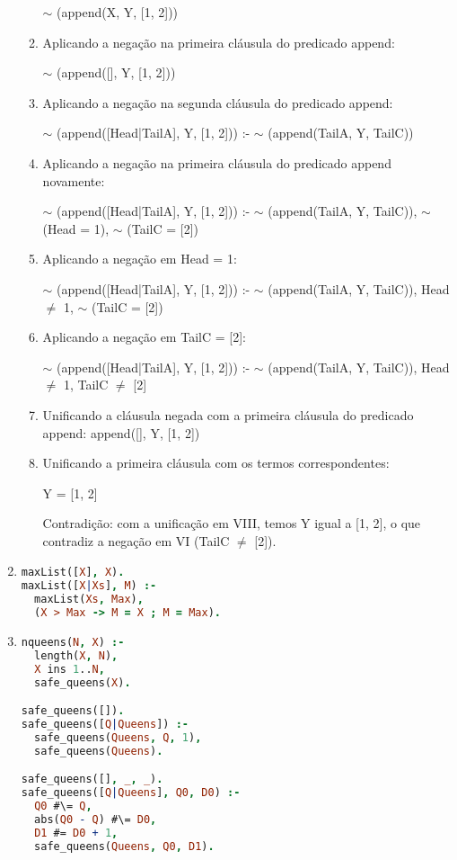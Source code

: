 \documentclass{article}
\begin{document}
\begin{enumerate}
\begin{enumerate}[I]
                        $\sim$ (append(X, Y, [1, 2]))
                    \item Aplicando a negação na primeira cláusula do predicado append:

                        $\sim$ (append([], Y, [1, 2]))
                    \item Aplicando a negação na segunda cláusula do predicado append:

                        $\sim$ (append([Head|TailA], Y, [1, 2])) :- $\sim$ (append(TailA, Y, TailC))
                    \item 
                        Aplicando a negação na primeira cláusula do predicado append novamente:

                        $\sim$ (append([Head|TailA], Y, [1, 2])) :- $\sim$ (append(TailA, Y, TailC)), $\sim$ (Head = 1), $\sim$ (TailC = [2])
                    \item 
                        Aplicando a negação em Head = 1:

                        $\sim$ (append([Head|TailA], Y, [1, 2])) :- $\sim$ (append(TailA, Y, TailC)), Head $\neq$ 1, $\sim$ (TailC = [2])

                    \item 
                        Aplicando a negação em TailC = [2]:

                        $\sim$ (append([Head|TailA], Y, [1, 2])) :- $\sim$ (append(TailA, Y, TailC)), Head $\neq$ 1, TailC $\neq$ [2]

                    \item 
                        Unificando a cláusula negada com a primeira cláusula do predicado append:
                        append([], Y, [1, 2])

                    \item 
                        Unificando a primeira cláusula com os termos correspondentes:

                        Y = [1, 2]

                        Contradição: com a unificação em VIII, temos Y igual a [1, 2], o que contradiz a negação em VI (TailC $\neq$ [2]).

                \end{enumerate}

            \item 
\begin{lstlisting}[language=prolog]
maxList([X], X).
maxList([X|Xs], M) :-
  maxList(Xs, Max),
  (X > Max -> M = X ; M = Max).
\end{lstlisting}

            \item 
\begin{lstlisting}[language=prolog]
nqueens(N, X) :-
  length(X, N),
  X ins 1..N,
  safe_queens(X).

safe_queens([]).
safe_queens([Q|Queens]) :-
  safe_queens(Queens, Q, 1),
  safe_queens(Queens).

safe_queens([], _, _).
safe_queens([Q|Queens], Q0, D0) :-
  Q0 #\= Q,
  abs(Q0 - Q) #\= D0,
  D1 #= D0 + 1,
  safe_queens(Queens, Q0, D1).
\end{lstlisting}
    \end{enumerate}
\end{document}
